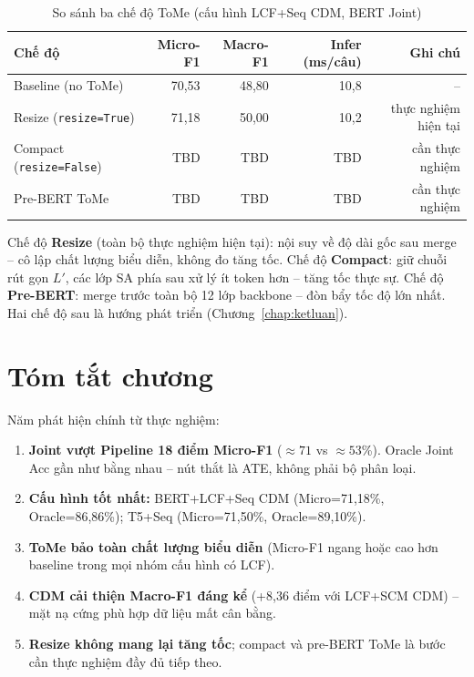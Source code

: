 \begin{table}[H]
\centering
\small
\caption{So sánh ba chế độ ToMe (cấu hình LCF+Seq CDM, BERT Joint)}
\label{tab:resize_compact}
\begin{tabular}{@{}lrrrr@{}}
\toprule
\textbf{Chế độ} & \textbf{Micro-F1} & \textbf{Macro-F1} & \textbf{Infer (ms/câu)} & \textbf{Ghi chú} \\
\midrule
Baseline (no ToMe)       & 70,53 & 48,80 & 10,8 & -- \\
Resize (\texttt{resize=True})   & 71,18 & 50,00 & 10,2 & thực nghiệm hiện tại \\
Compact (\texttt{resize=False}) & TBD   & TBD   & TBD  & cần thực nghiệm \\
Pre-BERT ToMe            & TBD   & TBD   & TBD  & cần thực nghiệm \\
\bottomrule
\end{tabular}
\end{table}

Chế độ \textbf{Resize} (toàn bộ thực nghiệm hiện tại): nội suy về độ
dài gốc sau merge -- cô lập chất lượng biểu diễn, không đo tăng tốc.
Chế độ \textbf{Compact}: giữ chuỗi rút gọn $L'$, các lớp SA phía sau
xử lý ít token hơn -- tăng tốc thực sự. Chế độ \textbf{Pre-BERT}: merge
trước toàn bộ 12 lớp backbone -- đòn bẩy tốc độ lớn nhất. Hai chế độ
sau là hướng phát triển (Chương~\ref{chap:ketluan}).

\section*{Tóm tắt chương}

Năm phát hiện chính từ thực nghiệm:

\begin{enumerate}
  \item \textbf{Joint vượt Pipeline 18 điểm Micro-F1} ($\approx71$ vs
        $\approx53$\%). Oracle Joint Acc gần như bằng nhau -- nút thắt
        là ATE, không phải bộ phân loại.
  \item \textbf{Cấu hình tốt nhất:} BERT+LCF+Seq CDM (Micro=71,18\%,
        Oracle=86,86\%); T5+Seq (Micro=71,50\%, Oracle=89,10\%).
  \item \textbf{ToMe bảo toàn chất lượng biểu diễn} (Micro-F1 ngang hoặc
        cao hơn baseline trong mọi nhóm cấu hình có LCF).
  \item \textbf{CDM cải thiện Macro-F1 đáng kể} (+8,36 điểm với
        LCF+SCM CDM) -- mặt nạ cứng phù hợp dữ liệu mất cân bằng.
  \item \textbf{Resize không mang lại tăng tốc}; compact và pre-BERT ToMe
        là bước cần thực nghiệm đầy đủ tiếp theo.
\end{enumerate}
